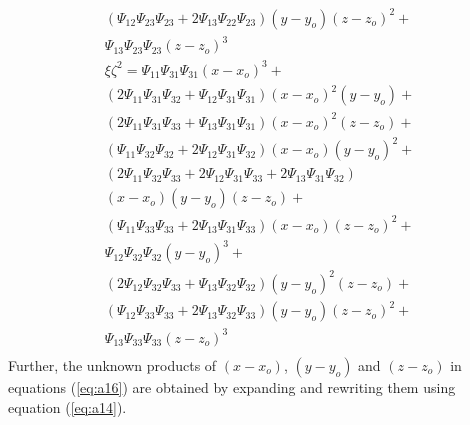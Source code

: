\begin{equation}
\begin{gathered}
    (\Psi_{12}\Psi_{23}\Psi_{23}+2\Psi_{13}\Psi_{22}\Psi_{23})(y-y_o)(z-z_o)^2+\\
    \Psi_{13}\Psi_{23}\Psi_{23}(z-z_o)^3\\
    \xi\zeta^2=\Psi_{11}\Psi_{31}\Psi_{31}(x-x_o)^3+\\
    (2\Psi_{11}\Psi_{31}\Psi_{32}+\Psi_{12}\Psi_{31}\Psi_{31})(x-x_o)^2(y-y_o)+\\
    (2\Psi_{11}\Psi_{31}\Psi_{33}+\Psi_{13}\Psi_{31}\Psi_{31})(x-x_o)^2(z-z_o)+\\
    (\Psi_{11}\Psi_{32}\Psi_{32}+2\Psi_{12}\Psi_{31}\Psi_{32})(x-x_o)(y-y_o)^2+\\
    (2\Psi_{11}\Psi_{32}\Psi_{33}+2\Psi_{12}\Psi_{31}\Psi_{33}+2\Psi_{13}\Psi_{31}\Psi_{32})\\
    (x-x_o)(y-y_o)(z-z_o)+\\
    (\Psi_{11}\Psi_{33}\Psi_{33}+2\Psi_{13}\Psi_{31}\Psi_{33})(x-x_o)(z-z_o)^2+\\
    \Psi_{12}\Psi_{32}\Psi_{32}(y-y_o)^3+\\
    (2\Psi_{12}\Psi_{32}\Psi_{33}+\Psi_{13}\Psi_{32}\Psi_{32})(y-y_o)^2(z-z_o)+\\
    (\Psi_{12}\Psi_{33}\Psi_{33}+2\Psi_{13}\Psi_{32}\Psi_{33})(y-y_o)(z-z_o)^2+\\
    \Psi_{13}\Psi_{33}\Psi_{33}(z-z_o)^3\\
    \end{gathered}
\end{equation}
Further, the unknown products of $(x-x_o)$, $(y-y_o)$ and $(z-z_o)$ in equations (\ref{eq:a16}) are obtained by expanding and rewriting them using equation (\ref{eq:a14}).

